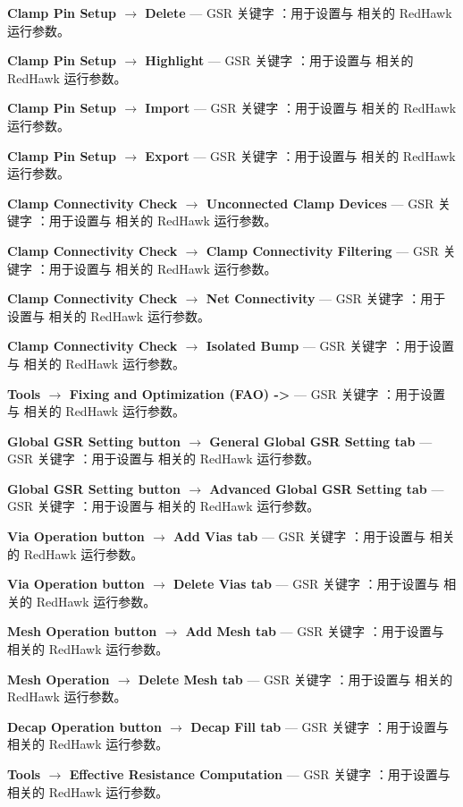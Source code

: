 \textbf{Clamp Pin Setup $\rightarrow$ Delete} — GSR 关键字 ：用于设置与  相关的 RedHawk 运行参数。

\textbf{Clamp Pin Setup $\rightarrow$ Highlight} — GSR 关键字 ：用于设置与  相关的 RedHawk 运行参数。

\textbf{Clamp Pin Setup $\rightarrow$ Import} — GSR 关键字 ：用于设置与  相关的 RedHawk 运行参数。

\textbf{Clamp Pin Setup $\rightarrow$ Export} — GSR 关键字 ：用于设置与  相关的 RedHawk 运行参数。

\textbf{Clamp Connectivity Check $\rightarrow$ Unconnected Clamp Devices} — GSR 关键字 ：用于设置与  相关的 RedHawk 运行参数。

\textbf{Clamp Connectivity Check $\rightarrow$ Clamp Connectivity Filtering} — GSR 关键字 ：用于设置与  相关的 RedHawk 运行参数。

\textbf{Clamp Connectivity Check $\rightarrow$ Net Connectivity} — GSR 关键字 ：用于设置与  相关的 RedHawk 运行参数。

\textbf{Clamp Connectivity Check $\rightarrow$ Isolated Bump} — GSR 关键字 ：用于设置与  相关的 RedHawk 运行参数。

\textbf{Tools $\rightarrow$ Fixing and Optimization (FAO) ->} — GSR 关键字 ：用于设置与  相关的 RedHawk 运行参数。

\textbf{Global GSR Setting button $\rightarrow$ General Global GSR Setting tab} — GSR 关键字 ：用于设置与  相关的 RedHawk 运行参数。

\textbf{Global GSR Setting button $\rightarrow$ Advanced Global GSR Setting tab} — GSR 关键字 ：用于设置与  相关的 RedHawk 运行参数。

\textbf{Via Operation button $\rightarrow$ Add Vias tab} — GSR 关键字 ：用于设置与  相关的 RedHawk 运行参数。

\textbf{Via Operation button $\rightarrow$ Delete Vias tab} — GSR 关键字 ：用于设置与  相关的 RedHawk 运行参数。

\textbf{Mesh Operation button $\rightarrow$ Add Mesh tab} — GSR 关键字 ：用于设置与  相关的 RedHawk 运行参数。

\textbf{Mesh Operation $\rightarrow$ Delete Mesh tab} — GSR 关键字 ：用于设置与  相关的 RedHawk 运行参数。

\textbf{Decap Operation button $\rightarrow$ Decap Fill tab} — GSR 关键字 ：用于设置与  相关的 RedHawk 运行参数。

\textbf{Tools $\rightarrow$ Effective Resistance Computation} — GSR 关键字 ：用于设置与  相关的 RedHawk 运行参数。

